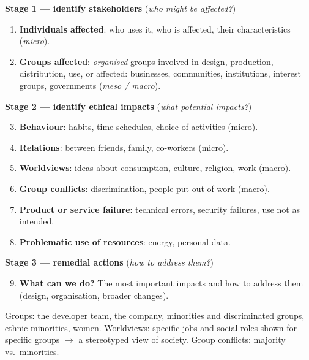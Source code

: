\documentclass[11pt,a4paper,openany]{book}
\begin{document}
\begin{algbox}[title={Nine blocks, three stages (cheat sheet 2.4)}]
\textbf{Stage 1 --- identify stakeholders} (\emph{who might be affected?})
\begin{enumerate}
  \item \textbf{Individuals affected}: who uses it, who is affected, their characteristics
        (\emph{micro}).
  \item \textbf{Groups affected}: \emph{organised} groups involved in design, production,
        distribution, use, or affected: businesses, communities, institutions, interest groups,
        governments (\emph{meso / macro}).
\end{enumerate}
\textbf{Stage 2 --- identify ethical impacts} (\emph{what potential impacts?})
\begin{enumerate}\setcounter{enumi}{2}
  \item \textbf{Behaviour}: habits, time schedules, choice of activities (micro).
  \item \textbf{Relations}: between friends, family, co-workers (micro).
  \item \textbf{Worldviews}: ideas about consumption, culture, religion, work (macro).
  \item \textbf{Group conflicts}: discrimination, people put out of work (macro).
  \item \textbf{Product or service failure}: technical errors, security failures, use not as
        intended.
  \item \textbf{Problematic use of resources}: energy, personal data.
\end{enumerate}
\textbf{Stage 3 --- remedial actions} (\emph{how to address them?})
\begin{enumerate}\setcounter{enumi}{8}
  \item \textbf{What can we do?} The most important impacts and how to address them (design,
        organisation, broader changes).
\end{enumerate}
\end{algbox}

\begin{exbox}[title={An image search engine (Guilbeault et al., 2024: online images amplify gender bias)}]
Groups: the developer team, the company, minorities and discriminated groups, ethnic minorities,
women. Worldviews: specific jobs and social roles shown for specific groups $\to$ a stereotyped
view of society. Group conflicts: majority vs.\ minorities.
\end{exbox}
\end{document}
